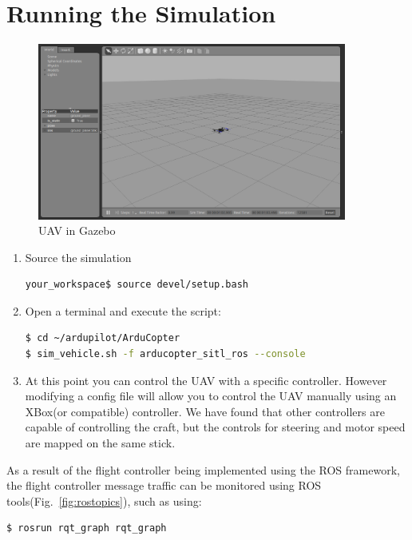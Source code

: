 \documentclass[10pt,a4paper,notitlepage]{report}
\begin{document}
\section*{Running the Simulation}

\begin{figure}[h]
\includegraphics[width=4in]{rossitl.png}
\caption{UAV in Gazebo}
\label{fig:sim}
\end{figure}
\begin{enumerate}
\item Source the simulation
\begin{lstlisting}[language=bash]
your_workspace$ source devel/setup.bash 
\end{lstlisting}
\item Open a terminal and execute the script:
\begin{lstlisting}[language=bash]
$ cd ~/ardupilot/ArduCopter
$ sim_vehicle.sh -f arducopter_sitl_ros --console
\end{lstlisting}

\item At this point you can control the UAV with a specific controller. However modifying a config file will allow you to control the UAV manually using an XBox(or compatible) controller. We have found that other controllers are capable of controlling the craft, but the controls for steering and motor speed are mapped on the same stick.
\end{enumerate}


\noindent As a result of the flight controller being implemented using the ROS framework, the flight controller message traffic can be monitored using ROS tools(Fig.~\ref{fig:rostopics}), such as using:
\begin{lstlisting}[language=bash]
$ rosrun rqt_graph rqt_graph
\end{lstlisting}
\end{document}

